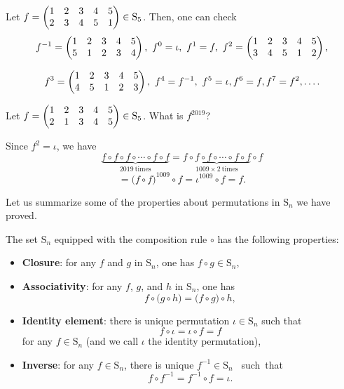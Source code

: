 \documentclass[11pt,dvipsnames]{book}
\numberwithin{equation}{section} %
\numberwithin{figure}{section} %
\numberwithin{table}{section} %
\begin{document}
 \begin{example}
Let $f=\left(\begin{matrix} %
1 & 2 & 3 & 4 & 5\cr%
2 & 3 & 4 & 5 & 1\cr%
\end{matrix}\right)\in\mathrm{S}_5$.  Then, one can check
$$f^{-1}=\left(\begin{matrix} %
1 & 2 & 3 & 4 & 5\cr%
5 & 1 & 2 & 3 & 4\cr%
\end{matrix}\right),\  f^{0}=\iota,\  f^{1}= f,\  f^{2}=\left(\begin{matrix} %
1 & 2 & 3 & 4 & 5\cr%
3 & 4 & 5 & 1 & 2\cr%
\end{matrix}\right),
$$

$$
f^{3}=\left(\begin{matrix} %
1 & 2 & 3 & 4 & 5\cr%
4 & 5 & 1 & 2 & 3\cr%
\end{matrix}\right),\ 
f^{4}= f^{-1},\ 
f^{5} = \iota,  f^{6}= f,  f^{7}= f^2,  \ldots.
$$
\end{example}

\begin{exercise}  Let $f=\left(\begin{matrix} %
1 & 2 & 3 & 4 & 5\cr%
2 & 1 & 3 & 4 & 5\cr%
\end{matrix}\right)\in\mathrm{S}_5$. What is $f^{2019}$?
\begin{solution}
 Since $f^{2}=\iota$,  we have
$$
\underbrace{f\circ f\circ f\circ\cdots\circ f\circ f}_{2019\ \mathrm{times}}=\underbrace{f\circ f\circ f\circ\cdots\circ f\circ f}_{1009\times 2\ \mathrm{times}}\circ f$$
$$=\Big(f\circ f\Big)^{1009}\circ f=\iota^{1009}\circ f= f.%
$$
\end{solution}
\end{exercise}

Let us summarize some of the properties about permutations in $\mathrm{S}_{n}$  we have proved.

\begin{lemma}%
The set $\mathrm{S}_n$ equipped with the composition rule $\circ$ has the following
properties:
\begin{itemize}
\item {\bf Closure}: for any $f$ and $g$ in $\mathrm{S}_n$,  one has $f\circ g\in\mathrm{S}_n$, %

\item {\bf Associativity}: for any $f$, $g$, and $h$ in $\mathrm{S}_n$, one has
$$f\circ \Big(g\circ h\Big)=\Big(f\circ g\Big)\circ h,$$

\item {\bf Identity element}: there is unique permutation $\iota\in\mathrm{S}_n$ such that
$$ f\circ\iota=\iota\circ f=f$$
for any $f\in\mathrm{S}_n$ (and we call $\iota$ the identity permutation),%

\item {\bf Inverse}: for any $f\in\mathrm{S}_n$,  there is unique $f^{-1}\in\mathrm{S}_n$~ such~that
$$
f\circ f^{-1}=f^{-1}\circ f=\iota.
$$
\end{itemize}
\end{lemma}
\end{document}
